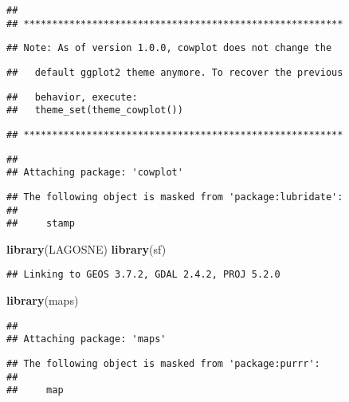 \documentclass[]{article}
\newenvironment{Shaded}{\begin{snugshade}}{\end{snugshade}}
\newcommand{\KeywordTok}[1]{\textcolor[rgb]{0.13,0.29,0.53}{\textbf{#1}}}
\newcommand{\NormalTok}[1]{#1}
\begin{document}
\begin{verbatim}
## 
## ********************************************************
\end{verbatim}

\begin{verbatim}
## Note: As of version 1.0.0, cowplot does not change the
\end{verbatim}

\begin{verbatim}
##   default ggplot2 theme anymore. To recover the previous
\end{verbatim}

\begin{verbatim}
##   behavior, execute:
##   theme_set(theme_cowplot())
\end{verbatim}

\begin{verbatim}
## ********************************************************
\end{verbatim}

\begin{verbatim}
## 
## Attaching package: 'cowplot'
\end{verbatim}

\begin{verbatim}
## The following object is masked from 'package:lubridate':
## 
##     stamp
\end{verbatim}

\begin{Shaded}
\begin{Highlighting}[]
\KeywordTok{library}\NormalTok{(LAGOSNE)}
\KeywordTok{library}\NormalTok{(sf)}
\end{Highlighting}
\end{Shaded}

\begin{verbatim}
## Linking to GEOS 3.7.2, GDAL 2.4.2, PROJ 5.2.0
\end{verbatim}

\begin{Shaded}
\begin{Highlighting}[]
\KeywordTok{library}\NormalTok{(maps)}
\end{Highlighting}
\end{Shaded}

\begin{verbatim}
## 
## Attaching package: 'maps'
\end{verbatim}

\begin{verbatim}
## The following object is masked from 'package:purrr':
## 
##     map
\end{verbatim}
\end{document}
